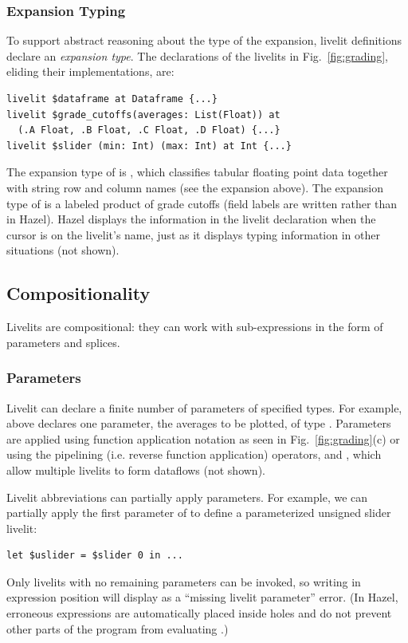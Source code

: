 \subsubsection{Expansion Typing} 
\label{sec:expansion-typing}
To support abstract reasoning about the type of the expansion,
livelit definitions declare an \emph{expansion type}.
The declarations of the livelits in Fig.~\ref{fig:grading},
eliding their implementations, are:
\begin{lstlisting}[numbers=none,xleftmargin=0cm]
livelit $dataframe at Dataframe {...}
livelit $grade_cutoffs(averages: List(Float)) at 
  (.A Float, .B Float, .C Float, .D Float) {...}
livelit $slider (min: Int) (max: Int) at Int {...}
\end{lstlisting}
The expansion type of  is ,
which classifies tabular floating point data together with string row and column names (see the expansion above).
The expansion type of  is a labeled product of grade cutoffs (field labels are written 
rather than  in Hazel).
Hazel displays the information in the livelit declaration when the cursor is on the livelit's name,
just as it displays typing information in other situations (not shown).

\subsection{Compositionality}\label{sec:splicing-and-parameterization}
Livelits are compositional: they can work with sub-expressions  
in the form of parameters and splices.

\subsubsection{Parameters}\label{sec:parameterization} 
Livelit can declare a finite number of parameters of specified types. 
For example,  above declares one parameter,
the averages to be plotted, of type .
Parameters are applied  
using function application notation 
as seen in Fig.~\ref{fig:grading}(c) or 
using the pipelining (i.e. reverse function application) operators, \li{<|} and \li{|>}, 
which allow multiple livelits to form dataflows (not shown).

Livelit abbreviations can partially apply parameters. For example, 
we can partially apply the first parameter of  to define a parameterized unsigned slider livelit:
\begin{lstlisting}[numbers=none,xleftmargin=0cm]
let $uslider = $slider 0 in ...
\end{lstlisting}
Only livelits with no remaining parameters can be invoked, 
so writing  in expression position will display as a ``missing livelit parameter'' error. 
(In Hazel, erroneous expressions 
are automatically placed inside holes and do not prevent other parts of the program from evaluating
\cite{HazelnutLive}.)


